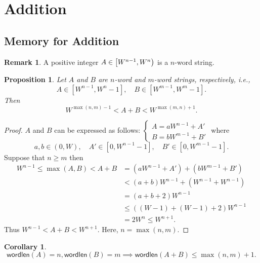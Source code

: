 \documentclass[12pt,openany]{book}
\newtheorem{proposition}[theorem]{Proposition}
\newtheorem{corollary}{Corollary}[theorem]
\theoremstyle{definition}
\newtheorem{remark}{Remark}[chapter]
\newcommand{\ie}{\textnormal{i.e.}}
\newcommand{\wordlen}{\mathsf{wordlen}}
\begin{document}
	\section{Addition}
	\subsection{Memory for Addition}
	\begin{remark}
		A positive integer \(A\in\intco{W^{n-1},W^n}\) is a \(n\)-word string.
	\end{remark}
	
	\begin{tcolorbox}[colframe=procolor,title={\color{white}\bf Upper and Lower Bound of Addition}]
		\begin{proposition}
			Let $A$ and $B$ are \(n\)-word and \(m\)-word strings, respectively, \ie, \[
			A\in[W^{n-1},W^{n}-1],\quad B\in[W^{m-1},W^m-1].
			\] Then \[
			W^{\max(n,m)-1}<A+B<W^{\max(m,n)+1}.
			\]
		\end{proposition}
	\end{tcolorbox}
	\begin{proof}
		$A$ and $B$ can be expressed as follows: 
		$\begin{cases}
			A=aW^{n-1}+A'\\
			B=bW^{m-1}+B'
		\end{cases}$ where \[
		a,b\in(0,W),\quad A'\in[0,W^{n-1}-1],\quad B'\in[0,W^{m-1}-1].
		\]
		Suppose that \(n\geq m\) then \begin{align*}
			W^{n-1}\leq\max(A,B)<A+B
			&=(aW^{n-1}+A')+(bW^{m-1}+B')\\
			&<(a+b)W^{n-1}+(W^{n-1}+W^{n-1})\\
			&=(a+b+2)W^{n-1}\\
			&\leq((W-1)+(W-1)+2)W^{n-1}\\
			&=2W^n\leq W^{n+1}.
		\end{align*} Thus $
		W^{n-1}<A+B<W^{n+1}.
		$ Here, \(n=\max(n,m)\).
	\end{proof}

	\begin{tcolorbox}[colframe=corcolor,title={\color{white}\bf }]
		\begin{corollary}
			\[
			\wordlen(A)=n,\wordlen(B)=m\implies\wordlen(A+B)\leq\max(n,m)+1.
			\]
		\end{corollary}
	\end{tcolorbox}
\end{document}
